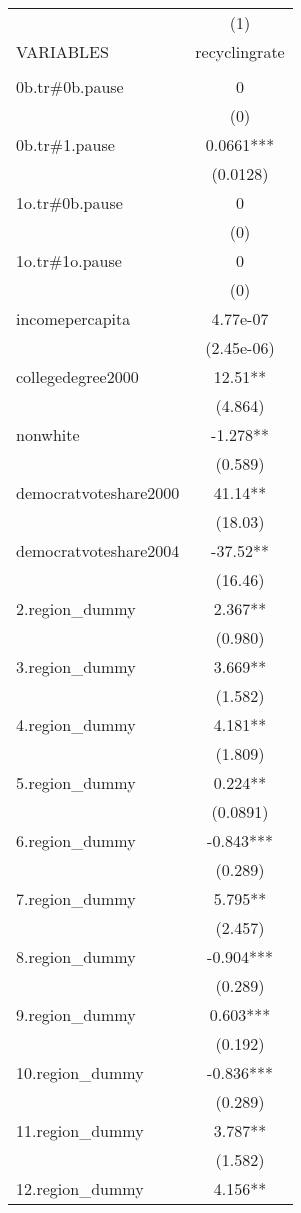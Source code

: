 \documentclass[]{article}
\begin{document}
\begin{tabular}{lc} \hline
 & (1) \\
VARIABLES & recyclingrate \\ \hline
 &  \\
0b.tr\#0b.pause & 0 \\
 & (0) \\
0b.tr\#1.pause & 0.0661*** \\
 & (0.0128) \\
1o.tr\#0b.pause & 0 \\
 & (0) \\
1o.tr\#1o.pause & 0 \\
 & (0) \\
incomepercapita & 4.77e-07 \\
 & (2.45e-06) \\
collegedegree2000 & 12.51** \\
 & (4.864) \\
nonwhite & -1.278** \\
 & (0.589) \\
democratvoteshare2000 & 41.14** \\
 & (18.03) \\
democratvoteshare2004 & -37.52** \\
 & (16.46) \\
2.region\_dummy & 2.367** \\
 & (0.980) \\
3.region\_dummy & 3.669** \\
 & (1.582) \\
4.region\_dummy & 4.181** \\
 & (1.809) \\
5.region\_dummy & 0.224** \\
 & (0.0891) \\
6.region\_dummy & -0.843*** \\
 & (0.289) \\
7.region\_dummy & 5.795** \\
 & (2.457) \\
8.region\_dummy & -0.904*** \\
 & (0.289) \\
9.region\_dummy & 0.603*** \\
 & (0.192) \\
10.region\_dummy & -0.836*** \\
 & (0.289) \\
11.region\_dummy & 3.787** \\
 & (1.582) \\
12.region\_dummy & 4.156** \\

\end{tabular}
\end{document}

